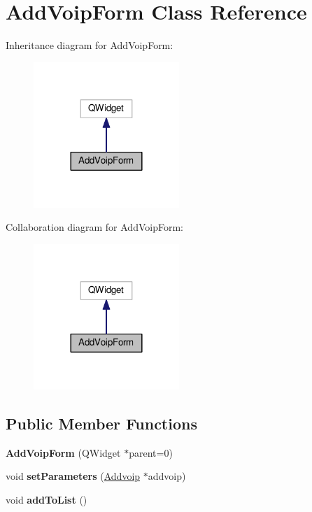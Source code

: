\hypertarget{class_add_voip_form}{}\section{Add\+Voip\+Form Class Reference}
\label{class_add_voip_form}


Inheritance diagram for Add\+Voip\+Form\+:
\nopagebreak
\begin{figure}[H]
\begin{center}
\leavevmode
\includegraphics[width=156pt]{class_add_voip_form__inherit__graph}
\end{center}
\end{figure}


Collaboration diagram for Add\+Voip\+Form\+:
\nopagebreak
\begin{figure}[H]
\begin{center}
\leavevmode
\includegraphics[width=156pt]{class_add_voip_form__coll__graph}
\end{center}
\end{figure}
\subsection*{Public Member Functions}
\begin{DoxyCompactItemize}
\item 
{\bfseries Add\+Voip\+Form} (Q\+Widget $\ast$parent=0)\hypertarget{class_add_voip_form_ae1cd1645ebf965031af269c967901ac2}{}\label{class_add_voip_form_ae1cd1645ebf965031af269c967901ac2}

\item 
void {\bfseries set\+Parameters} (\hyperlink{class_addvoip}{Addvoip} $\ast$addvoip)\hypertarget{class_add_voip_form_a2adfb89905ba253b81c1cf9e3d806ac8}{}\label{class_add_voip_form_a2adfb89905ba253b81c1cf9e3d806ac8}

\item 
void {\bfseries add\+To\+List} ()\hypertarget{class_add_voip_form_ae6da358bab6e81d7c954f6943f5cd019}{}\label{class_add_voip_form_ae6da358bab6e81d7c954f6943f5cd019}

\end{DoxyCompactItemize}

